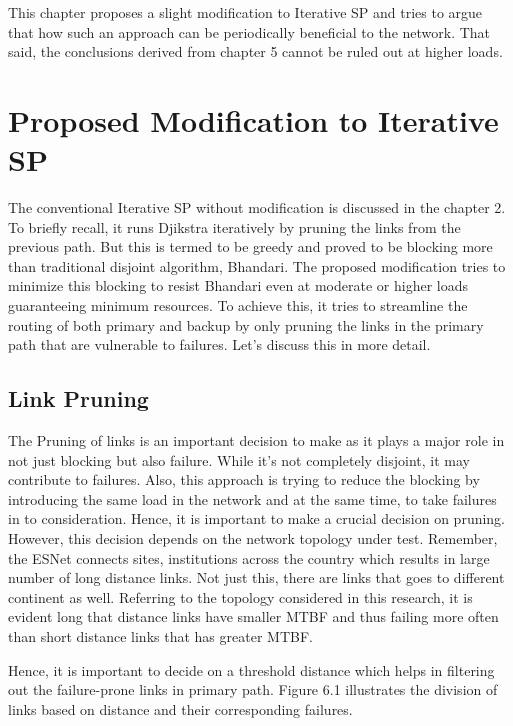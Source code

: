 
\noindent 

 This chapter proposes a slight modification to Iterative SP and tries to argue that how such an approach can be periodically beneficial to the network. That said, the conclusions derived from chapter 5 cannot be ruled out at higher loads.

\section {Proposed Modification to Iterative SP}

The conventional Iterative SP without modification is discussed in the chapter 2. To briefly recall, it runs Djikstra iteratively by pruning the links from the previous path. But this is termed to be greedy and proved to be blocking more than traditional disjoint algorithm, Bhandari. The proposed modification tries to minimize this blocking to resist Bhandari even at moderate or higher loads guaranteeing minimum resources. To achieve this, it tries to streamline the routing of both primary and backup by only pruning the links in the primary path that are vulnerable to failures. Let's discuss this in more detail. 

\subsection {Link Pruning}
                                                    
The Pruning of links is an important decision to make as it plays a major role in not just blocking but also failure. While it's not completely disjoint, it may contribute to failures. Also, this approach is trying to reduce the blocking by introducing the same load in the network and at the same time, to take failures in to consideration. Hence, it is important to make a crucial decision on pruning. However, this decision depends on the network topology under test. Remember, the ESNet connects sites, institutions across the country which results in large number of long distance links. Not just this, there are links that goes to different continent as well. Referring to the topology considered in this research, it is evident long that distance links have smaller MTBF and thus failing more often than short distance links that has greater MTBF. 

Hence, it is important to decide on a threshold distance which helps in filtering out the failure-prone links in primary path. Figure 6.1 illustrates the division of links based on distance and their corresponding failures.

